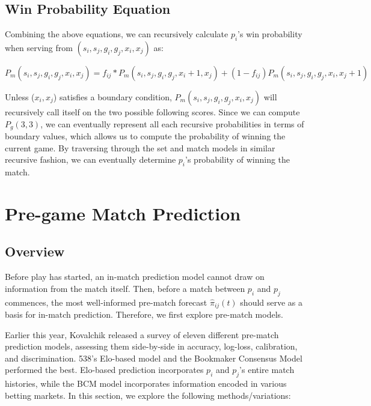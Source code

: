 \documentclass[chapterprefix=false]{report}
\begin{document}
\section{Win Probability Equation}
Combining the above equations, we can recursively calculate $p_i$'s win probability when serving from $(s_i,s_j,g_i,g_j,{x}_i,{x}_j)$ as:

\resizebox{1 \textwidth}{!} 
{
    $P_m(s_i,s_j,g_i,g_j,{x}_i,{x}_j)=f_{ij}*P_m(s_i,s_j,g_i,g_j,{x}_i+1,{x}_j) + (1-f_{ij}) P_m(s_i,s_j,g_i,g_j,{x}_i,{x}_j+1)$ 
}


Unless (${x}_i,{x}_j$) satisfies a boundary condition, $P_m(s_i,s_j,g_i,g_j,{x}_i,{x}_j)$ will recursively call itself on the two possible following scores. Since we can compute $P_g(3,3)$, we can eventually represent all each recursive probabilities in terms of boundary values, which allows us to compute the probability of winning the current game. By traversing through the set and match models in similar recursive fashion, we can eventually determine $p_i$'s probability of winning the match.  


\chapter{Pre-game Match Prediction}

\section{Overview}
Before play has started, an in-match prediction model cannot draw on information from the match itself. Then, before a match between $p_i$ and $p_j$ commences, the most well-informed pre-match forecast $\hat{\pi}_{ij}(t)$ should serve as a basis for in-match prediction. Therefore, we first explore pre-match models.

Earlier this year, Kovalchik released a survey of eleven different pre-match prediction models, assessing them side-by-side in accuracy, log-loss, calibration, and discrimination. 538's Elo-based model and the Bookmaker Consensus Model performed the best. Elo-based prediction incorporates $p_i$ and $p_j$'s entire match histories, while the BCM model incorporates information encoded in various betting markets. In this section, we explore the following methods/variations:
\end{document}
